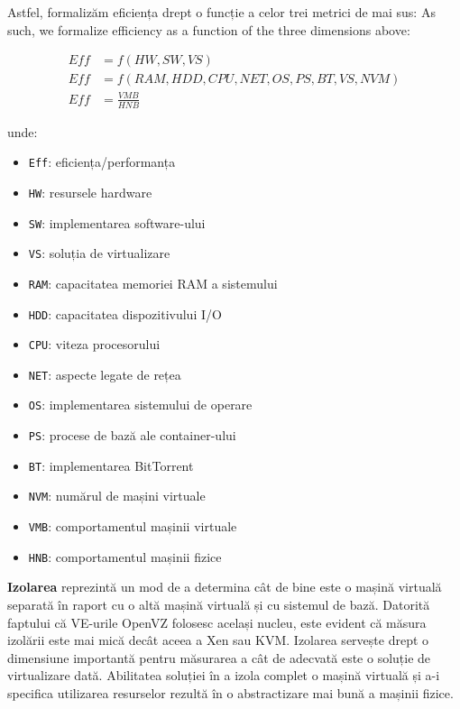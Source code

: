 Astfel, formalizăm eficiența drept o funcție a celor trei metrici de mai sus:
As such, we formalize efficiency as a function of the three dimensions above:

\begin{align}
Eff & = f(HW, SW, VS)\\
Eff & = f(RAM, HDD, CPU, NET, OS, PS, BT, VS, NVM)\\
Eff &= \frac{VMB}{HNB}
\end{align}

unde:

\begin{multicols}{2}
    \begin{itemize}
      \item \texttt{Eff}: eficiența/performanța
      \item \texttt{HW}: resursele hardware
      \item \texttt{SW}: implementarea software-ului
      \item \texttt{VS}: soluția de virtualizare
      \item \texttt{RAM}: capacitatea memoriei RAM a sistemului
      \item \texttt{HDD}: capacitatea dispozitivului I/O
      \item \texttt{CPU}: viteza procesorului
      \item \texttt{NET}: aspecte legate de rețea
      \item \texttt{OS}: implementarea sistemului de operare
      \item \texttt{PS}: procese de bază ale container-ului
      \item \texttt{BT}: implementarea BitTorrent
      \item \texttt{NVM}: numărul de mașini virtuale
      \item \texttt{VMB}: comportamentul mașinii virtuale
      \item \texttt{HNB}: comportamentul mașinii fizice
    \end{itemize}
\end{multicols}

\textbf{Izolarea} reprezintă un mod de a determina cât de bine este o
mașină virtuală separată în raport cu o altă mașină virtuală și cu sistemul
de bază. Datorită faptului că VE-urile OpenVZ folosesc același nucleu,
este evident că măsura izolării este mai mică decât aceea a Xen sau KVM.
Izolarea servește drept o dimensiune importantă pentru măsurarea a cât
de adecvată este o soluție de virtualizare dată. Abilitatea soluției
în a izola complet o mașină virtuală și a-i specifica utilizarea
resurselor rezultă în o abstractizare mai bună a mașinii fizice.

